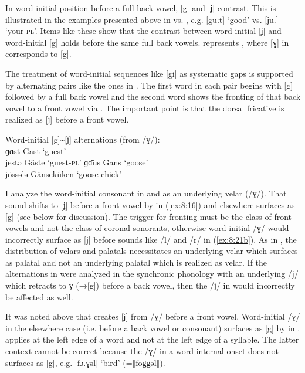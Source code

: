 In word-initial position before a full back vowel, [g] and [ʝ] contrast. This is illustrated in the examples presented above in  vs. , e.g. [guːt] ‘good’ vs. [ʝuː] ‘your\textsc{{}-pl}’. Items like these show that the contrast between word-initial [ʝ] and word-initial [g] holds before the same full back vowels.  represents , where [ɣ] in  corresponds to [g].

The treatment of word-initial sequences like [gi] as systematic gaps is supported by alternating pairs like the ones in . The first word in each pair begins with [g] followed by a full back vowel and the second word shows the fronting of that back vowel to a front vowel via . The important point is that the dorsal fricative is realized as [ʝ] before a front vowel.

\ea%
\label{ex:8:24}Word-initial [g]{\textasciitilde}[ʝ] alternations (from /ɣ/):\\
\ea\label{ex:8:24a} ɡɑst \tab [gɑst] \tab Gast \tab ‘guest’ \\
    jestə \tab [ʝɛstə] \tab Gäste \tab ‘guest-\textsc{pl}’ 
\ex\label{ex:8:24b} ɡɑ̄us \tab  [gɑːus] \tab  Gans \tab ‘goose’ \\
    jössələ \tab [ʝœsələ] \tab Gänseküken \tab ‘goose chick’ 
  \z
\z 

I analyze the word-initial consonant in  and  as an underlying velar (/ɣ/). That sound shifts to [ʝ] before a front vowel by  in (\ref{ex:8:16}) and elsewhere surfaces as [g] (see below for discussion). The trigger for fronting must be the class of front vowels and not the class of coronal sonorants, otherwise word-initial /ɣ/ would incorrectly surface as [ʝ] before sounds like /l/ and /r/ in (\ref{ex:8:21b}). As in , the distribution of velars and palatals necessitates an underlying velar which surfaces as palatal and not an underlying palatal which is realized as velar. If the alternations in  were analyzed in the synchronic phonology with an underlying /ʝ/ which retracts to {\textbar}ɣ{\textbar} (→[g]) before a back vowel, then the /ʝ/ in  would incorrectly be affected as well.

It was noted above that  creates [ʝ] from /ɣ/ before a front vowel. Word-initial /ɣ/ in the elsewhere case (i.e. before a back vowel or consonant) surfaces as [g] by  in .  applies at the left edge of a word and not at the left edge of a syllable. The latter context cannot be correct because the /ɣ/ in a word-internal onset does not surfaces as [g], e.g. [fɔ.ɣəl] ‘bird’ (=⟦foǥǥəl⟧).

